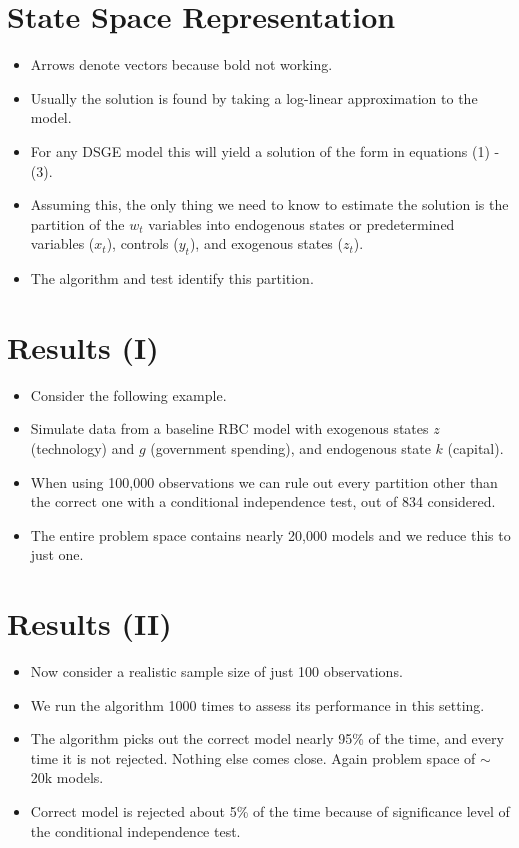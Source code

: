 \documentclass{article}
\begin{document}
\section*{State Space Representation}
\begin{itemize}
    \item Arrows denote vectors because bold not working.
    \item Usually the solution is found by taking a log-linear approximation to the model.
    \item For any DSGE model this will yield a solution of the form in equations (1) - (3).
    \item Assuming this, the only thing we need to know to estimate the solution is the partition of the $w_t$ variables into endogenous states or predetermined variables ($x_t$), controls ($y_t$), and exogenous states ($z_t$). 
    \item The algorithm and test identify this partition.
\end{itemize}

\section*{Results (I)}
\begin{itemize}
    \item Consider the following example.
    \item Simulate data from a baseline RBC model with exogenous states $z$ (technology) and $g$ (government spending), and endogenous state $k$ (capital).
    \item When using 100,000 observations we can rule out every partition other than the correct one with a conditional independence test, out of 834 considered. 
    \item The entire problem space contains nearly 20,000 models and we reduce this to just one.
\end{itemize}

\section*{Results (II)}
\begin{itemize}
    \item Now consider a realistic sample size of just 100 observations. 
    \item We run the algorithm 1000 times to assess its performance in this setting.
    \item The algorithm picks out the correct model nearly 95\% of the time, and every time it is not rejected. Nothing else comes close. Again problem space of $\sim$ 20k models.
    \item Correct model is rejected about 5\% of the time because of significance level of the conditional independence test.
\end{itemize}
\end{document}
